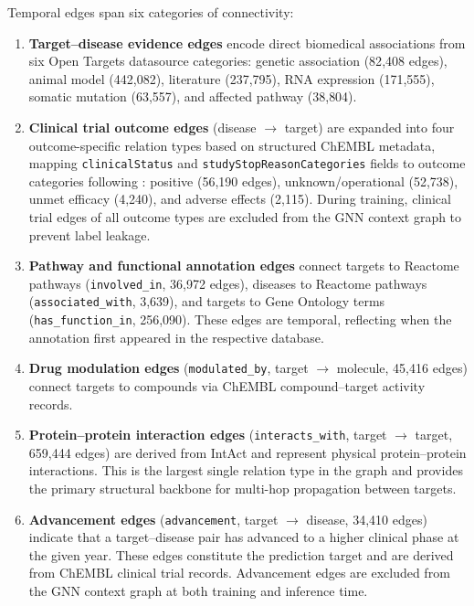 \documentclass[a4,center]{NAR}
\begin{document}
{Temporal edges span six categories of connectivity:

\begin{enumerate}
\item \textbf{Target--disease evidence edges} encode direct biomedical
associations from six Open Targets datasource categories: genetic
association (82{,}408 edges), animal model (442{,}082), literature
(237{,}795), RNA expression (171{,}555), somatic mutation (63{,}557),
and affected pathway (38{,}804).

\item \textbf{Clinical trial outcome edges} (disease $\rightarrow$ target)
are expanded into four outcome-specific relation types based on structured
ChEMBL metadata, mapping \texttt{clinicalStatus} and
\texttt{studyStopReasonCategories} fields to outcome categories following
\citet{Narganes-Carlon2024GATher:Links}: positive (56{,}190 edges), unknown/operational
(52{,}738), unmet efficacy (4{,}240), and adverse effects (2{,}115). During
training, clinical trial edges of all outcome types are excluded from the
GNN context graph to prevent label leakage.

\item \textbf{Pathway and functional annotation edges} connect targets to
Reactome pathways (\texttt{involved\_in}, 36{,}972 edges), diseases to
Reactome pathways (\texttt{associated\_with}, 3{,}639), and targets to Gene
Ontology terms (\texttt{has\_function\_in}, 256{,}090). These edges are
temporal, reflecting when the annotation first appeared in the respective
database.

\item \textbf{Drug modulation edges} (\texttt{modulated\_by},
target $\rightarrow$ molecule, 45{,}416 edges) connect targets to
compounds via ChEMBL compound--target activity records.

\item \textbf{Protein--protein interaction edges}
(\texttt{interacts\_with}, target $\rightarrow$ target, 659{,}444 edges)
are derived from IntAct and represent physical protein--protein
interactions. This is the largest single relation type in the graph and
provides the primary structural backbone for multi-hop propagation
between targets.

\item \textbf{Advancement edges} (\texttt{advancement},
target $\rightarrow$ disease, 34{,}410 edges) indicate that a
target--disease pair has advanced to a higher clinical phase at the given
year. These edges constitute the prediction target and are derived from
ChEMBL clinical trial records. Advancement edges are excluded from the
GNN context graph at both training and inference time.
\end{enumerate}

}
\end{document}
